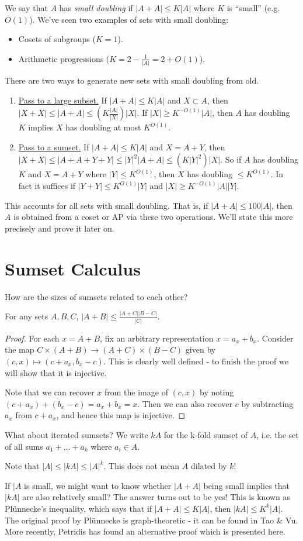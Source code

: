 \documentclass[10pt,a4paper]{article}
\begin{document}
We say that $A$ has \emph{small doubling} if $|A+A| \leq K|A|$ where $K$ is ``small'' (e.g. $O(1)$). We've seen two examples of sets with small doubling:
\begin{itemize}
  \item Cosets of subgroups ($K=1$).
  \item Arithmetic progressions ($K = 2-\frac{1}{|A|} = 2+O(1)$).
\end{itemize}
There are two ways to generate new sets with small doubling from old.
\begin{enumerate}
  \item \underline{Pass to a large subset.} If $|A+A| \leq K|A|$ and $X \subset A$, then $|X+X| \leq |A+A| \leq \left(K\frac{|A|}{|X|}\right)|X|$. If $|X| \geq K^{-O(1)}|A|$, then $A$ has doubling $K$ implies $X$ has doubling at most $K^{O(1)}$.
  \item \underline{Pass to a sumset.} If $|A+A|\leq K|A|$ and $X = A+Y$, then $|X+X| \leq |A+A+Y+Y| \leq |Y|^2|A+A| \leq (K|Y|^2)|X|$. So if $A$ has doubling $K$ and $X = A+Y$ where $|Y| \leq K^{O(1)}$, then $X$ has doubling $\leq K^{O(1)}$. In fact it suffices if $|Y+Y| \leq K^{O(1)}|Y|$ and $|X| \geq K^{-O(1)}|A||Y|$.
\end{enumerate}
This accounts for all sets with small doubling. That is, if $|A+A| \leq 100|A|$, then $A$ is obtained from a coset or AP via these two operations. We'll state this more precisely and prove it later on.
\section{Sumset Calculus}
How are the sizes of sumsets related to each other?
\begin{lemma}
  For any sets $A,B,C$, $|A+B| \leq \frac{|A+C||B-C|}{|C|}$.
\end{lemma}
\begin{proof}
  For each $x = A+B$, fix an arbitrary representation $x=a_x+b_x$. Consider the map $C\times(A+B) \to (A+C)\times (B-C)$ given by $(c,x)\mapsto (c+a_x,b_x-c)$. This is clearly well defined - to finish the proof we will show that it is injective.

  Note that we can recover $x$ from the image of $(c,x)$ by noting $(c+a_x) + (b_x-c) = a_x+b_x = x$. Then we can also recover $c$ by subtracting $a_x$ from $c+a_x$, and hence this map is injective.
\end{proof}
What about iterated sumsets? We write $kA$ for the k-fold sumset of $A$, i.e. the set of all sums $a_1+ \ldots + a_k$ where $a_i \in A$.

Note that $|A| \leq |kA| \leq |A|^k$. This does not mean $A$ dilated by $k$!

If $|A$ is small, we might want to know whether $|A+A|$ being small implies that $|kA|$ are also relatively small? The answer turns out to be yes! This is known as Pl\"unnecke's inequality, which says that if $|A+A|\leq K|A|$, then $|kA|\leq K^k|A|$. The original proof by Pl\"unnecke is graph-theoretic - it can be found in Tao \& Vu. More recently, Petridis has found an alternative proof which is presented here.
\end{document}
